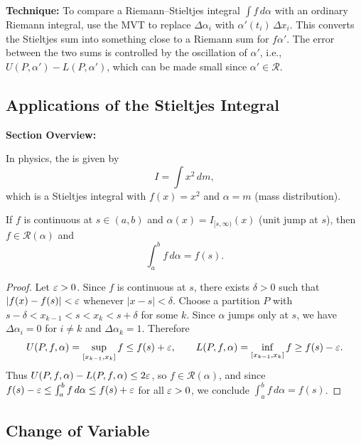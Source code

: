 \documentclass[../master/master.tex]{subfiles}
\begin{document}
\begin{notebox}
\textbf{Technique:} To compare a Riemann--Stieltjes integral $\int f\,d\alpha$ with an ordinary Riemann integral, use the MVT to replace $\Delta\alpha_i$ with $\alpha'(t_i)\,\Delta x_i$. This converts the Stieltjes sum into something close to a Riemann sum for $f\alpha'$. The error between the two sums is controlled by the oscillation of $\alpha'$, i.e., $U(P,\alpha') - L(P,\alpha')$, which can be made small since $\alpha' \in \mathscr{R}$.
\end{notebox}

\subsection{Applications of the Stieltjes Integral}

\begin{summarybox}
\textbf{Section Overview:}
\end{summarybox}

\begin{example}
In physics, the  is given by
\[
I = \int x^2\,dm,
\]
which is a Stieltjes integral with $f(x) = x^2$ and $\alpha = m$ (mass distribution).
\end{example}

\begin{theorem}
If $f$ is continuous at $s \in (a,b)$ and $\alpha(x) = I_{[s,\infty)}(x)$ (unit jump at $s$), then $f \in \mathscr{R}(\alpha)$ and
\[
\int_a^b f\,d\alpha = f(s).
\]
\end{theorem}

\begin{proof}
Let $\varepsilon > 0$. Since $f$ is continuous at $s$, there exists $\delta > 0$ such that $|f(x) - f(s)| < \varepsilon$ whenever $|x - s| < \delta$. Choose a partition $P$ with $s - \delta < x_{k-1} < s < x_k < s + \delta$ for some $k$. Since $\alpha$ jumps only at $s$, we have $\Delta\alpha_i = 0$ for $i \neq k$ and $\Delta\alpha_k = 1$. Therefore
\[
U(P, f, \alpha) = \sup_{[x_{k-1}, x_k]} f \leq f(s) + \varepsilon, \qquad L(P, f, \alpha) = \inf_{[x_{k-1}, x_k]} f \geq f(s) - \varepsilon.
\]
Thus $U(P, f, \alpha) - L(P, f, \alpha) \leq 2\varepsilon$, so $f \in \mathscr{R}(\alpha)$, and since $f(s) - \varepsilon \leq \int_a^b f\,d\alpha \leq f(s) + \varepsilon$ for all $\varepsilon > 0$, we conclude $\int_a^b f\,d\alpha = f(s)$.
\end{proof}

\subsection{Change of Variable}
\end{document}
